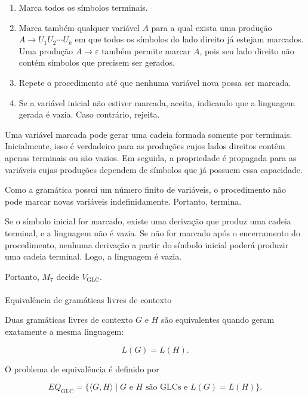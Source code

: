 \documentclass[
  brazilian,
  letterpaper,
]{book}
\makeatletter
\let\oldparagraph\paragraph
\renewcommand{\paragraph}{
    \@ifstar
      \xxxParagraphStar
      \xxxParagraphNoStar
  }
\newcommand{\xxxParagraphStar}[1]{\oldparagraph*{#1}\mbox{}}
\newcommand{\xxxParagraphNoStar}[1]{\oldparagraph{#1}\mbox{}}
\providecommand{\tightlist}{%
  \setlength{\itemsep}{0pt}\setlength{\parskip}{0pt}}
\theoremstyle{plain}
\theoremstyle{definition}
\theoremstyle{remark}
\makeatother
\begin{document}
\begin{enumerate}
\def\labelenumi{\arabic{enumi}.}
\tightlist
\item
  Marca todos os símbolos terminais.
\item
  Marca também qualquer variável \(A\) para a qual exista uma produção
  \(A\rightarrow U_1U_2\cdots U_k\) em que todos os símbolos do lado
  direito já estejam marcados. Uma produção \(A\rightarrow\varepsilon\)
  também permite marcar \(A\), pois seu lado direito não contém símbolos
  que precisem ser gerados.
\item
  Repete o procedimento até que nenhuma variável nova possa ser marcada.
\item
  Se a variável inicial não estiver marcada, aceita, indicando que a
  linguagem gerada é vazia. Caso contrário, rejeita.
\end{enumerate}

Uma variável marcada pode gerar uma cadeia formada somente por
terminais. Inicialmente, isso é verdadeiro para as produções cujos lados
direitos contêm apenas terminais ou são vazios. Em seguida, a
propriedade é propagada para as variáveis cujas produções dependem de
símbolos que já possuem essa capacidade.

Como a gramática possui um número finito de variáveis, o procedimento
não pode marcar novas variáveis indefinidamente. Portanto, termina.

Se o símbolo inicial for marcado, existe uma derivação que produz uma
cadeia terminal, e a linguagem não é vazia. Se não for marcado após o
encerramento do procedimento, nenhuma derivação a partir do símbolo
inicial poderá produzir uma cadeia terminal. Logo, a linguagem é vazia.

Portanto, \(M_7\) decide \(V_{\mathrm{GLC}}\).

\paragraph{Equivalência de gramáticas livres de
contexto}\label{equivaluxeancia-de-gramuxe1ticas-livres-de-contexto}

Duas gramáticas livres de contexto \(G\) e \(H\) são equivalentes quando
geram exatamente a mesma linguagem:

\[
L(G)=L(H).
\]

O problema de equivalência é definido por

\[
EQ_{\mathrm{GLC}}=\{\langle G,H\rangle\mid G\text{ e }H\text{ são GLCs e }L(G)=L(H)\}.
\]
\end{document}
